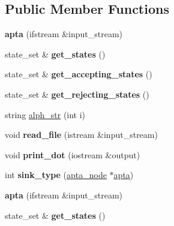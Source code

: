 \subsection*{Public Member Functions}
\begin{DoxyCompactItemize}
\item 
{\bfseries apta} (ifstream \&input\+\_\+stream)\hypertarget{classapta_ac73a92ff14388c87804623895ce116da}{}\label{classapta_ac73a92ff14388c87804623895ce116da}

\item 
state\+\_\+set \& {\bfseries get\+\_\+states} ()\hypertarget{classapta_a70f18be1f59c6b937b4a7e503a38e1c9}{}\label{classapta_a70f18be1f59c6b937b4a7e503a38e1c9}

\item 
state\+\_\+set \& {\bfseries get\+\_\+accepting\+\_\+states} ()\hypertarget{classapta_a8df053716928abf6d31dd05de70061af}{}\label{classapta_a8df053716928abf6d31dd05de70061af}

\item 
state\+\_\+set \& {\bfseries get\+\_\+rejecting\+\_\+states} ()\hypertarget{classapta_a18483d0e28f3bde60006a541d1fd42cd}{}\label{classapta_a18483d0e28f3bde60006a541d1fd42cd}

\item 
string \hyperlink{classapta_a244ffcaf3ff27062eec5463d26033ac8}{alph\+\_\+str} (int i)
\item 
void {\bfseries read\+\_\+file} (istream \&input\+\_\+stream)\hypertarget{classapta_aba445f4073c6358d699f523f6f8890b3}{}\label{classapta_aba445f4073c6358d699f523f6f8890b3}

\item 
void {\bfseries print\+\_\+dot} (iostream \&output)\hypertarget{classapta_ac882456f8a38ed04e27763f25580975f}{}\label{classapta_ac882456f8a38ed04e27763f25580975f}

\item 
int {\bfseries sink\+\_\+type} (\hyperlink{classapta__node}{apta\+\_\+node} $\ast$\hyperlink{classapta}{apta})\hypertarget{classapta_a81486fd0903cbc20ada8a3e326266de5}{}\label{classapta_a81486fd0903cbc20ada8a3e326266de5}

\item 
{\bfseries apta} (ifstream \&input\+\_\+stream)\hypertarget{classapta_ac73a92ff14388c87804623895ce116da}{}\label{classapta_ac73a92ff14388c87804623895ce116da}

\item 
state\+\_\+set \& {\bfseries get\+\_\+states} ()\hypertarget{classapta_ad5b7d9c858bd2b528fdddb6873634d76}{}\label{classapta_ad5b7d9c858bd2b528fdddb6873634d76}


\end{DoxyCompactItemize}

